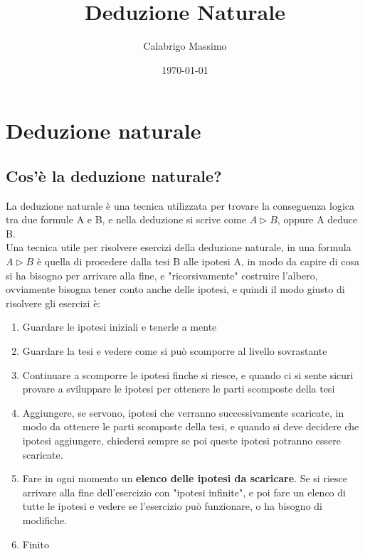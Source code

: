 \documentclass[11pt]{article}
\begin{document}
\title{Deduzione Naturale}
\author{Calabrigo Massimo}
\date{\today}
\maketitle

\tableofcontents

\section{Deduzione naturale}
\subsection{Cos'è la deduzione naturale?}
La deduzione naturale è una tecnica utilizzata per trovare la conseguenza logica tra due formule A e B, 
e nella deduzione si scrive come $A \triangleright B$, oppure A deduce B.\\
Una tecnica utile per risolvere esercizi della deduzione naturale, in una formula $A \triangleright B$
 è quella di procedere dalla tesi B alle ipotesi A, in modo da capire di cosa si ha bisogno per arrivare alla fine, e "ricorsivamente" 
 costruire l'albero, ovviamente bisogna tener conto anche delle ipotesi, e quindi il modo 
 giusto di risolvere gli esercizi è:
 \begin{enumerate}
     \item Guardare le ipotesi iniziali e tenerle a mente
     \item Guardare la tesi e vedere come si può scomporre al livello sovrastante
     \item Continuare a scomporre le ipotesi finche si riesce, e quando ci si sente sicuri provare a 
     sviluppare le ipotesi per ottenere le parti scomposte della tesi
     \item Aggiungere, se servono, ipotesi che verranno successivamente scaricate, in modo da ottenere le parti scomposte della tesi, 
     e quando si deve decidere che ipotesi aggiungere, chiedersi sempre se poi queste ipotesi potranno essere scaricate.
     \item Fare in ogni momento un \textbf{elenco delle ipotesi da scaricare}. Se si riesce arrivare alla fine dell'esercizio con "ipotesi infinite",
      e poi fare un elenco di tutte le ipotesi e vedere se l'esercizio può funzionare, o ha bisogno di modifiche.
     \item Finito
 \end{enumerate}
\end{document}
